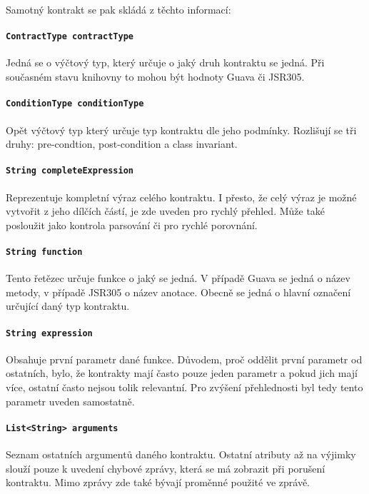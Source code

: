 			Samotný kontrakt se pak skládá z těchto informací:
			
			\paragraph{\texttt{ContractType contractType}} Jedná se o výčtový typ, který určuje o jaký druh kontraktu se jedná. Při současném stavu knihovny to mohou být hodnoty Guava či JSR305.
			
			\paragraph{\texttt{ConditionType conditionType}} Opět výčtový typ který určuje typ kontraktu dle jeho podmínky. Rozlišují se tři druhy: pre-condtion, post-condition a class invariant.
			
			\paragraph{\texttt{String completeExpression}} Reprezentuje kompletní výraz celého kontraktu. I přesto, že celý výraz je možné vytvořit z jeho dílčích částí, je zde uveden pro rychlý přehled. Může také posloužit jako kontrola parsování či pro rychlé porovnání.
			
			\paragraph{\texttt{String function}} Tento řetězec určuje funkce o jaký se jedná. V případě Guava se jedná o název metody, v případě JSR305 o název anotace. Obecně se jedná o hlavní označení určující daný typ kontraktu.
			
			\paragraph{\texttt{String expression}} Obsahuje první parametr dané funkce. Důvodem, proč oddělit první parametr od ostatních, bylo, že kontrakty mají často pouze jeden parametr a pokud jich mají více, ostatní často nejsou tolik relevantní. Pro zvýšení přehlednosti byl tedy tento parametr uveden samostatně.
			
			\paragraph{\texttt{List<String> arguments}} Seznam ostatních argumentů daného kontraktu. Ostatní atributy až na výjimky slouží pouze k uvedení chybové zprávy, která se má zobrazit při porušení kontraktu. Mimo zprávy zde také bývají proměnné použité ve zprávě. 
			
